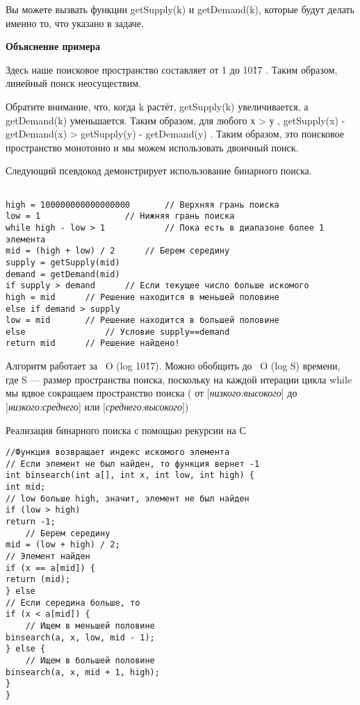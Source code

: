 Вы можете вызвать функции getSupply(k) и getDemand(k), которые будут делать именно то, что указано в задаче.

\vspace{\baselineskip}
\textbf{Объяснение примера}
\vspace{\baselineskip}

Здесь наше поисковое пространство составляет от 1 до 10\^17 . Таким образом, линейный поиск неосуществим.

\vspace{\baselineskip}
Обратите внимание, что, когда k растёт, getSupply(k) увеличивается, а getDemand(k) уменьшается. Таким образом, для любого х > у , getSupply(x) - getDemand(x) > getSupply(y) - getDemand(y) . Таким образом, это поисковое пространство монотонно и мы можем использовать двоичный поиск.

\vspace{\baselineskip}
Следующий псевдокод демонстрирует использование бинарного поиска.

\vspace{\baselineskip}
\begin{verbatim}
	
high = 100000000000000000		// Верхняя грань поиска
low = 1					// Нижняя грань поиска
while high - low > 1			// Пока есть в диапазоне более 1 элемента
mid = (high + low) / 2		// Берем середину
supply = getSupply(mid)			
demand = getDemand(mid)
if supply > demand		// Если текущее число больше искомого
high = mid		// Решение находится в меньшей половине
else if demand > supply		
low = mid		// Решение находится в большей половине
else				// Условие supply==demand
return mid		// Решение найдено!

\end{verbatim}


\newpage
Алгоритм работает за ~O (log 10\^17). Можно обобщить до ~O (log S) времени, где S --- размер пространства поиска, поскольку на каждой итерации цикла while мы вдвое сокращаем пространство поиска ( от [\textit{низкого:высокого}] до  [\textit{низкого:среднего}] или  [\textit{среднего:высокого}])

\vspace{\baselineskip}
Реализация бинарного поиска с помощью рекурсии на С
\vspace{\baselineskip}

\begin{verbatim} 
//Функция возвращает индекс искомого элемента
// Если элемент не был найден, то функция вернет -1
int binsearch(int a[], int x, int low, int high) {
int mid;
// low больше high, значит, элемент не был найден
if (low > high)
return -1;
	// Берем середину
mid = (low + high) / 2;
// Элемент найден
if (x == a[mid]) {
return (mid);
} else
// Если середина больше, то
if (x < a[mid]) {
	// Ищем в меньшей половине
binsearch(a, x, low, mid - 1);
} else {
	// Ищем в большей половине
binsearch(a, x, mid + 1, high);
}
}
\end{verbatim}
\vspace{\baselineskip}
